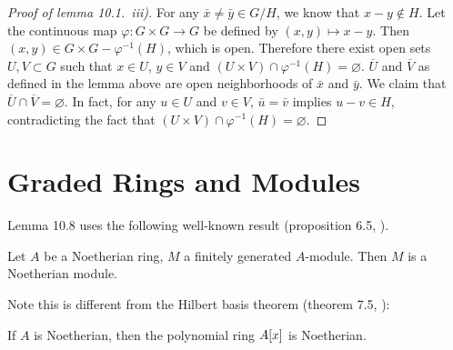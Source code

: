 \documentclass{note}
\begin{document}
\begin{proof}[Proof of lemma 10.1.~iii)] For any
  $\bar{x} \neq \bar{y} \in G/H$, we know that $x - y \notin H$. Let
  the continuous map $\varphi\colon G\times G \to G$ be defined by $(x,y) \mapsto
    x - y$. Then $(x,y) \in G\times G - \varphi^{-1}(H)$, which is open. Therefore
  there exist open sets $U,V \subset G$ such that $x\in U$, $y\in V$ and
  $(U\times V) \cap \varphi^{-1}(H) = \varnothing$. $\overline{U}$ and
  $\overline{V}$ as defined in the lemma above are open neighborhoods of
  $\bar{x}$ and $\bar{y}$. We claim that $\overline{U} \cap \overline{V} =
    \varnothing$. In fact, for any $u\in U$ and $v\in V$, $\bar{u} = \bar{v}$
  implies $u - v \in H$, contradicting the fact that $(U\times V) \cap
    \varphi^{-1}(H) = \varnothing$.
\end{proof}

\section*{Graded Rings and Modules}
Lemma 10.8 uses the following well-known result (proposition 6.5, ).
\begin{proposition*}
  Let $A$ be a Noetherian ring, $M$ a finitely generated $A$-module. Then $M$ is
  a Noetherian module.
\end{proposition*}
Note this is different from the Hilbert basis theorem (theorem 7.5, ):
\begin{theorem*}
  If $A$ is Noetherian, then the polynomial ring $\polynomials{A}{x}$ is
  Noetherian.
\end{theorem*}
\end{document}
